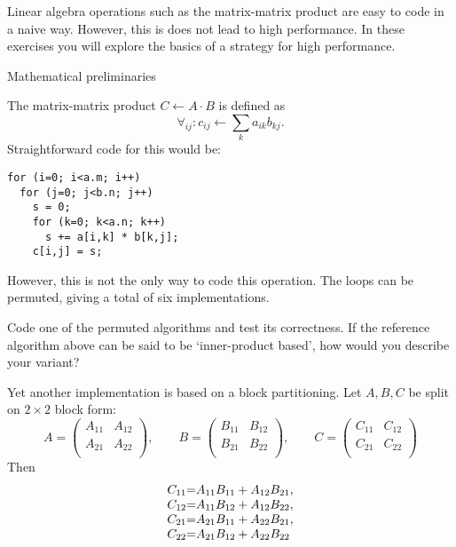 

Linear algebra operations such as the matrix-matrix product are easy
to code in a naive way. However, this is does not lead to high
performance. In these exercises you will explore the basics of a
strategy for high performance.

 {Mathematical preliminaries}

The matrix-matrix product $C\leftarrow A\cdot B$ is defined as
\[ \forall_{ij}\colon c_{ij}\leftarrow \sum_k a_{ik}b_{kj}. \]
Straightforward code for this would be:
\begin{lstlisting}
for (i=0; i<a.m; i++)
  for (j=0; j<b.n; j++)
    s = 0;
    for (k=0; k<a.n; k++)
      s += a[i,k] * b[k,j];
    c[i,j] = s;
\end{lstlisting}
However, this is not the only way to code this operation.
The loops can be permuted, giving a total of six implementations.

\begin{exercise}
  Code one of the permuted algorithms and test its correctness. If the
  reference algorithm above can be said to be `inner-product based',
  how would you describe your variant?
\end{exercise}

Yet another implementation is based on a block partitioning. Let
$A,B,C$ be split on $2\times 2$ block form:
\[
A=
\begin{pmatrix}
  A_{11}&A_{12}\\ A_{21}&A_{22}\\
\end{pmatrix},\qquad
B=
\begin{pmatrix}
  B_{11}&B_{12}\\ B_{21}&B_{22}\\
\end{pmatrix},\qquad
C=
\begin{pmatrix}
  C_{11}&C_{12}\\ C_{21}&C_{22}\\
\end{pmatrix}
\]
Then
\begin{equation}
  \begin{array}{r@{=}l}
    C_{11}&A_{11}B_{11}+A_{12}B_{21},\\
    C_{12}&A_{11}B_{12}+A_{12}B_{22},\\
    C_{21}&A_{21}B_{11}+A_{22}B_{21},\\
    C_{22}&A_{21}B_{12}+A_{22}B_{22}\\
  \end{array}
  \label{eq:22matprod}
\end{equation}

